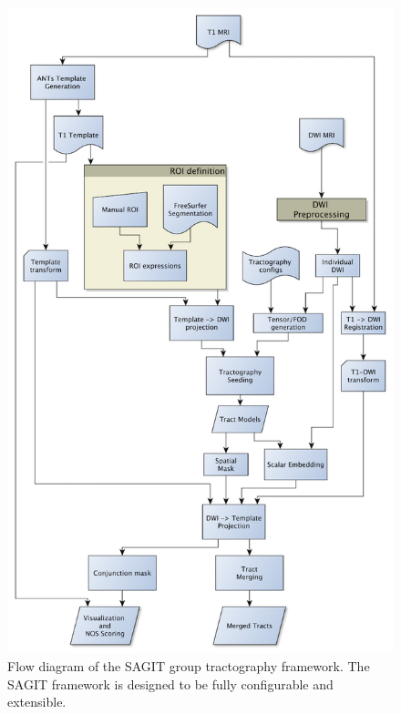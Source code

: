 \begin{figure}[p]
\centering
\includegraphics[width=140mm]{figure1.png}
\caption{Flow diagram of the SAGIT group tractography framework. The SAGIT framework is designed to be fully configurable and extensible.}
\label{fig:SGfigure1}
\end{figure}

